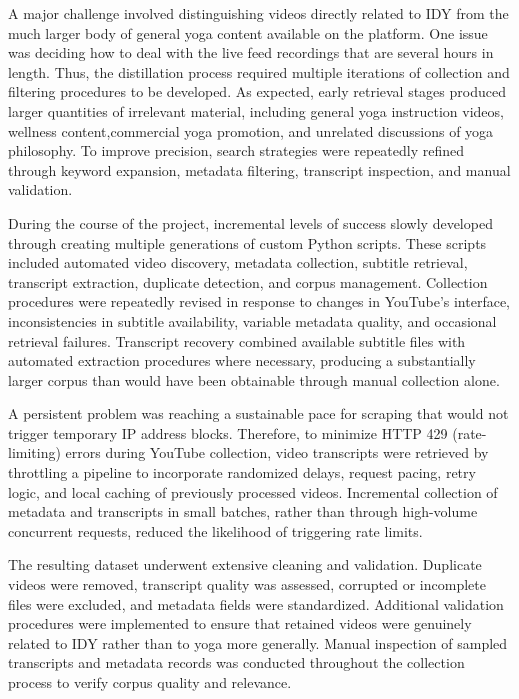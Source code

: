 \documentclass[11pt]{article}
\begin{document}
A major challenge involved distinguishing videos directly related to IDY from the much larger body of general yoga content available on the platform. One issue was deciding how to deal with the live feed recordings that are several hours in length. Thus, the distillation process required multiple iterations of collection and filtering procedures to be developed. As expected, early retrieval stages produced larger quantities of irrelevant material, including general yoga instruction videos, wellness content,commercial yoga promotion, and unrelated discussions of yoga philosophy. To improve precision, search strategies were repeatedly refined through keyword expansion, metadata filtering, transcript inspection, and manual validation.

During the course of the project, incremental levels of success slowly developed through creating multiple generations of custom Python scripts. These scripts included  automated video discovery, metadata collection, subtitle retrieval, transcript extraction, duplicate detection, and corpus management. Collection procedures were repeatedly revised in response to changes in YouTube's interface, inconsistencies in subtitle availability, variable metadata quality, and occasional retrieval failures. Transcript recovery combined available subtitle files with automated extraction procedures where necessary, producing a substantially larger corpus than would have been obtainable through manual collection alone.

A persistent problem was reaching a sustainable pace for scraping that would not trigger temporary IP address blocks. Therefore, to minimize HTTP 429 (rate-limiting) errors during YouTube collection, video transcripts were retrieved by throttling a pipeline to incorporate randomized delays, request pacing, retry logic, and local caching of previously processed videos. Incremental collection of metadata and transcripts in small batches, rather than through high-volume concurrent requests, reduced the likelihood of triggering rate limits.

The resulting dataset underwent extensive cleaning and validation. Duplicate videos were removed, transcript quality was assessed, corrupted or incomplete files were excluded, and metadata fields were standardized. Additional validation procedures were implemented to ensure that retained videos were genuinely related to IDY rather than to yoga more generally. Manual inspection of sampled transcripts and metadata records was conducted throughout the collection process to verify corpus quality and relevance.
\end{document}
